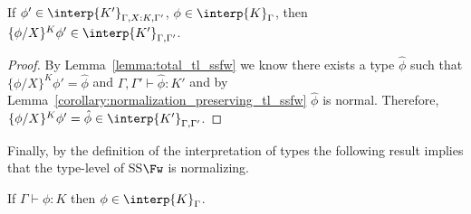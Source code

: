 \begin{lemma}
  If $\phi' \in \interp{K'}_{\Gamma,X:K,\Gamma'}$, $\phi \in \interp{K}_\Gamma$, then 
  $\{\phi/X\}^K \phi' \in \interp{K'}_{\Gamma,\Gamma'}$.
  
  \label{lemma:interpretation_of_types_closed_substitution_ssfw}
\end{lemma}
\begin{proof}
  By Lemma~\ref{lemma:total_tl_ssfw} we know there exists a type $\hat{\phi}$ 
  such that $\{\phi/X\}^K \phi' = \hat{\phi}$ and $\Gamma,\Gamma' \vdash \hat{\phi}:K'$ and by 
  Lemma~\ref{corollary:normalization_preserving_tl_ssfw} $\hat{\phi}$ is normal.  Therefore,
  $\{\phi/X\}^K \phi' = \hat{\phi} \in \interp{K'}_{\Gamma,\Gamma'}$.
\end{proof}
\noindent
Finally, by the definition of the interpretation of types the following result implies that the type-level
of SS$\Fw$ is normalizing.
\begin{thm}
  If $\Gamma \vdash \phi:K$ then $\phi \in \interp{K}_\Gamma$.
  \label{thm:soundness_ssfw}
\end{thm}
